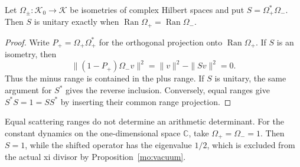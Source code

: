 \begin{proposition}
\label{v4-arith:mc:scattering}
Let $\Omega_\pm:\mathcal K_0\to\mathcal K$ be isometries of
complex Hilbert spaces and put $S=\Omega_+^*\Omega_-$.
Then $S$ is unitary exactly when
$\operatorname{Ran}\Omega_+=\operatorname{Ran}\Omega_-$.
\end{proposition}
\begin{proof}
Write $P_+=\Omega_+\Omega_+^*$ for the orthogonal projection onto
$\operatorname{Ran}\Omega_+$. If $S$ is an isometry, then
\[
 \|(1-P_+)\Omega_-v\|^2
 =\|v\|^2-\|Sv\|^2=0.
\]
Thus the minus range is contained in the plus range.
If $S$ is unitary, the same argument for $S^*$ gives the reverse
inclusion. Conversely, equal ranges give
$S^*S=1=SS^*$ by inserting their common range projection.
\end{proof}

Equal scattering ranges do not determine an arithmetic determinant.
For the constant dynamics on the one-dimensional space $\mathbb C$,
take $\Omega_+=\Omega_-=1$. Then $S=1$, while the shifted operator
has the eigenvalue $1/2$, which is excluded from the actual xi divisor
by Proposition~\ref{mo:vacuum}.
